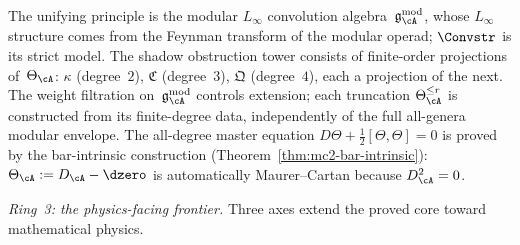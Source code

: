 The unifying principle is the modular $L_\infty$ convolution
algebra~$\gAmod$, whose $L_\infty$ structure comes
from the Feynman transform of the modular operad; $\Convstr$ is its strict model. The shadow obstruction tower consists of
finite-order projections of~$\Theta_\cA$:
$\kappa$ (degree~$2$),
$\mathfrak{C}$ (degree~$3$), $\mathfrak{Q}$ (degree~$4$), each
a projection of the next. The weight filtration on~$\gAmod$
controls extension; each truncation
$\Theta_\cA^{\le r}$ is constructed from its finite-degree data,
independently of the full all-genera modular envelope. The all-degree master equation
$D\Theta + \frac{1}{2}[\Theta,\Theta] = 0$ is proved by the
bar-intrinsic construction
(Theorem~\ref{thm:mc2-bar-intrinsic}): $\Theta_\cA := D_\cA - \dzero$
is automatically Maurer--Cartan because $D_\cA^2 = 0$.

\emph{Ring~3: the physics-facing frontier.}
Three axes extend the proved core toward mathematical physics.
